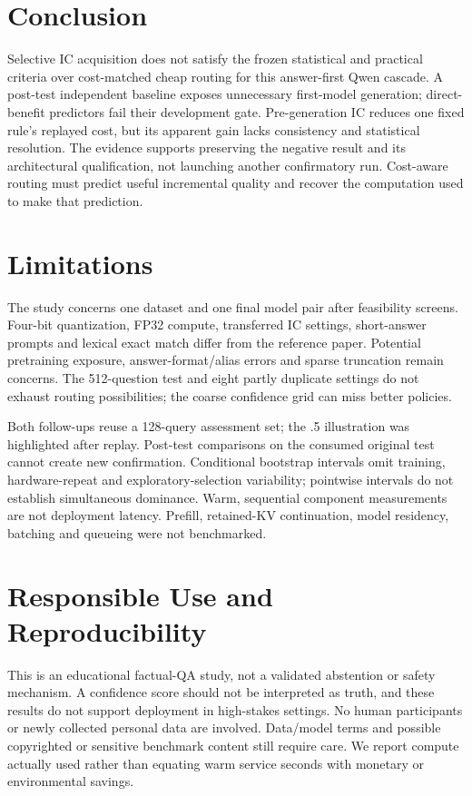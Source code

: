 \documentclass[11pt]{article}
\begin{document}
\section{Conclusion}
Selective IC acquisition does not satisfy the frozen statistical and practical criteria over cost-matched cheap routing for this answer-first Qwen cascade. A post-test independent baseline exposes unnecessary first-model generation; direct-benefit predictors fail their development gate. Pre-generation IC reduces one fixed rule's replayed cost, but its apparent gain lacks consistency and statistical resolution. The evidence supports preserving the negative result and its architectural qualification, not launching another confirmatory run. Cost-aware routing must predict useful incremental quality and recover the computation used to make that prediction.

\section*{Limitations}
The study concerns one dataset and one final model pair after feasibility screens. Four-bit quantization, FP32 compute, transferred IC settings, short-answer prompts and lexical exact match differ from the reference paper. Potential pretraining exposure, answer-format/alias errors and sparse truncation remain concerns. The 512-question test and eight partly duplicate settings do not exhaust routing possibilities; the coarse confidence grid can miss better policies.

Both follow-ups reuse a 128-query assessment set; the .5 illustration was highlighted after replay. Post-test comparisons on the consumed original test cannot create new confirmation. Conditional bootstrap intervals omit training, hardware-repeat and exploratory-selection variability; pointwise intervals do not establish simultaneous dominance. Warm, sequential component measurements are not deployment latency. Prefill, retained-KV continuation, model residency, batching and queueing were not benchmarked.

\section*{Responsible Use and Reproducibility}
This is an educational factual-QA study, not a validated abstention or safety mechanism. A confidence score should not be interpreted as truth, and these results do not support deployment in high-stakes settings. No human participants or newly collected personal data are involved. Data/model terms and possible copyrighted or sensitive benchmark content still require care. We report compute actually used rather than equating warm service seconds with monetary or environmental savings.
\end{document}
